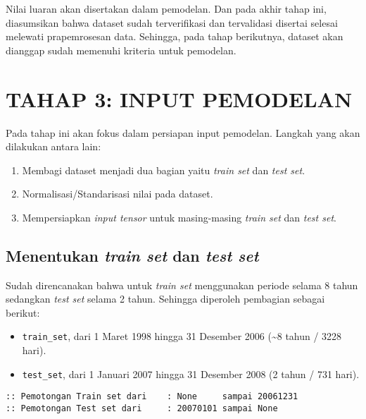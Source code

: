 \documentclass[11pt]{article}
\providecommand{\tightlist}{%
      \setlength{\itemsep}{0pt}\setlength{\parskip}{0pt}}
\begin{document}
Nilai luaran akan disertakan dalam pemodelan. Dan pada akhir tahap ini,
diasumsikan bahwa dataset sudah terverifikasi dan tervalidasi disertai
selesai melewati prapemrosesan data. Sehingga, pada tahap berikutnya,
dataset akan dianggap sudah memenuhi kriteria untuk pemodelan.

    \hypertarget{tahap-3-input-pemodelan}{%
\section{TAHAP 3: INPUT PEMODELAN}\label{tahap-3-input-pemodelan}}

Pada tahap ini akan fokus dalam persiapan input pemodelan. Langkah yang
akan dilakukan antara lain:

\begin{enumerate}
\def\labelenumi{\arabic{enumi}.}
\tightlist
\item
  Membagi dataset menjadi dua bagian yaitu \emph{train set} dan
  \emph{test set}.
\item
  Normalisasi/Standarisasi nilai pada dataset.
\item
  Mempersiapkan \emph{input tensor} untuk masing-masing \emph{train set}
  dan \emph{test set}.
\end{enumerate}

    \hypertarget{menentukan-train-set-dan-test-set}{%
\subsection{\texorpdfstring{Menentukan \emph{train set} dan \emph{test
set}}{Menentukan train set dan test set}}\label{menentukan-train-set-dan-test-set}}

Sudah direncanakan bahwa untuk \emph{train set} menggunakan periode
selama 8 tahun sedangkan \emph{test set} selama 2 tahun. Sehingga
diperoleh pembagian sebagai berikut:

\begin{itemize}
\tightlist
\item
  \texttt{train\_set}, dari 1 Maret 1998 hingga 31 Desember 2006
  (\textasciitilde{}8 tahun / 3228 hari).
\item
  \texttt{test\_set}, dari 1 Januari 2007 hingga 31 Desember 2008 (2
  tahun / 731 hari).
\end{itemize}

    \begin{Verbatim}[commandchars=\\\{\}]
:: Pemotongan Train set dari    : None     sampai 20061231
:: Pemotongan Test set dari     : 20070101 sampai None
    \end{Verbatim}
\end{document}
